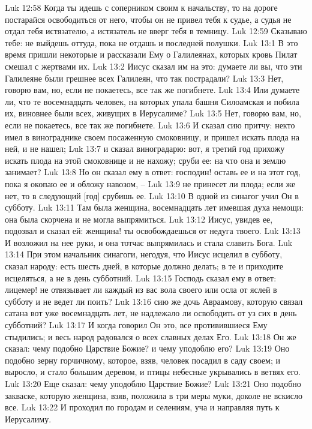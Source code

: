 Luk 12:58  Когда ты идешь с соперником своим к начальству, то на дороге постарайся освободиться от него, чтобы он не привел тебя к судье, а судья не отдал тебя истязателю, а истязатель не вверг тебя в темницу.
Luk 12:59  Сказываю тебе: не выйдешь оттуда, пока не отдашь и последней полушки.
Luk 13:1  В это время пришли некоторые и рассказали Ему о Галилеянах, которых кровь Пилат смешал с жертвами их.
Luk 13:2  Иисус сказал им на это: думаете ли вы, что эти Галилеяне были грешнее всех Галилеян, что так пострадали?
Luk 13:3  Нет, говорю вам, но, если не покаетесь, все так же погибнете.
Luk 13:4  Или думаете ли, что те восемнадцать человек, на которых упала башня Силоамская и побила их, виновнее были всех, живущих в Иерусалиме?
Luk 13:5  Нет, говорю вам, но, если не покаетесь, все так же погибнете.
Luk 13:6  И сказал сию притчу: некто имел в винограднике своем посаженную смоковницу, и пришел искать плода на ней, и не нашел;
Luk 13:7  и сказал виноградарю: вот, я третий год прихожу искать плода на этой смоковнице и не нахожу; сруби ее: на что она и землю занимает?
Luk 13:8  Но он сказал ему в ответ: господин! оставь ее и на этот год, пока я окопаю ее и обложу навозом, --
Luk 13:9  не принесет ли плода; если же нет, то в следующий [год] срубишь ее.
Luk 13:10  В одной из синагог учил Он в субботу.
Luk 13:11  Там была женщина, восемнадцать лет имевшая духа немощи: она была скорчена и не могла выпрямиться.
Luk 13:12  Иисус, увидев ее, подозвал и сказал ей: женщина! ты освобождаешься от недуга твоего.
Luk 13:13  И возложил на нее руки, и она тотчас выпрямилась и стала славить Бога.
Luk 13:14  При этом начальник синагоги, негодуя, что Иисус исцелил в субботу, сказал народу: есть шесть дней, в которые должно делать; в те и приходите исцеляться, а не в день субботний.
Luk 13:15  Господь сказал ему в ответ: лицемер! не отвязывает ли каждый из вас вола своего или осла от яслей в субботу и не ведет ли поить?
Luk 13:16  сию же дочь Авраамову, которую связал сатана вот уже восемнадцать лет, не надлежало ли освободить от уз сих в день субботний?
Luk 13:17  И когда говорил Он это, все противившиеся Ему стыдились; и весь народ радовался о всех славных делах Его.
Luk 13:18  Он же сказал: чему подобно Царствие Божие? и чему уподоблю его?
Luk 13:19  Оно подобно зерну горчичному, которое, взяв, человек посадил в саду своем; и выросло, и стало большим деревом, и птицы небесные укрывались в ветвях его.
Luk 13:20  Еще сказал: чему уподоблю Царствие Божие?
Luk 13:21  Оно подобно закваске, которую женщина, взяв, положила в три меры муки, доколе не вскисло все.
Luk 13:22  И проходил по городам и селениям, уча и направляя путь к Иерусалиму.
